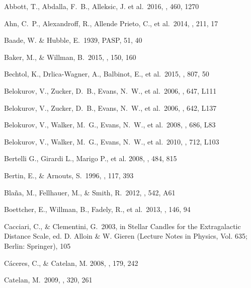 \documentclass[iop]{emulateapj}
\begin{document}

\begin{thebibliography}{}

 Abbott, T., Abdalla, F.~B., Alleksic, J. et al.\ 2016, \mnras, 460, 1270

 Ahn, C.~P., Alexandroff, R., Allende Prieto, C., et al.\ 2014, \apjs, 211, 17 

 Baade, W. 
\& Hubble, E.\ 1939, PASP, 51, 40

 Baker, M., \& Willman, B.\ 2015, \aj, 150, 160 

 Bechtol, K., Drlica-Wagner, A., Balbinot, E., et al.\ 2015, \apj, 807, 50

 Belokurov, V., Zucker, D.~B., Evans, N.~W., et al.\ 2006, \apjl, 647, L111 

 Belokurov, V., Zucker, D.~B., Evans, N.~W., et al.\ 2006, \apjl, 642, L137

 Belokurov, V., Walker, M.~G., Evans, N.~W., et al.\ 2008, \apjl, 686, L83 

 Belokurov, V., Walker, M.~G., Evans, N.~W., et al.\ 2010, \apjl, 712, L103 

Bertelli G., Girardi L., Marigo P., et al. 2008, \aap, 484, 815


 Bertin, E., \& Arnouts, S.\ 1996, \aaps, 117, 393 

 Bla{\~n}a, M., Fellhauer, M., \& Smith, R.\ 2012, \aap, 542, A61 

 Boettcher, E., Willman, B., Fadely, R., et al.\ 2013, \aj, 146, 94 

 Cacciari, C., \& Clementini, G.\ 2003, in Stellar Candles for the Extragalactic Distance Scale, ed. D. Alloin \& W. Gieren (Lecture Notes in Physics, Vol. 635; Berlin: Springer), 105

{C{\'a}ceres}, C., \& {Catelan}, M. 2008, \apjs, 179, 242

 Catelan, M.\ 2009, \apss, 320, 261


\end{thebibliography}
\end{document}
